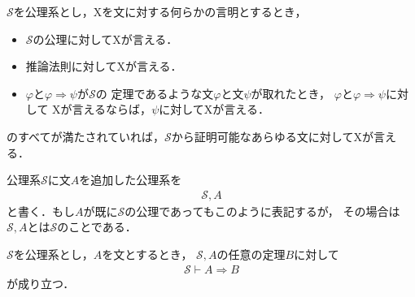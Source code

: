 	\begin{screen}
		\begin{metaaxm}[証明に対する構造的帰納法]
			$\mathscr{S}$を公理系とし，Xを文に対する何らかの言明とするとき，
			\begin{itemize}
				\item $\mathscr{S}$の公理に対してXが言える．
				\item 推論法則に対してXが言える．
				\item $\varphi$と$\varphi \Longrightarrow \psi$が$\mathscr{S}$の
					定理であるような文$\varphi$と文$\psi$が取れたとき，
					$\varphi$と$\varphi \Longrightarrow \psi$に対して
					Xが言えるならば，$\psi$に対してXが言える．
			\end{itemize}
			のすべてが満たされていれば，$\mathscr{S}$から証明可能なあらゆる文に対してXが言える．
		\end{metaaxm}
	\end{screen}
	
	公理系$\mathscr{S}$に文$A$を追加した公理系を
	\begin{align}
		\mathscr{S}, A
	\end{align}
	と書く．もし$A$が既に$\mathscr{S}$の公理であってもこのように表記するが，
	その場合は$\mathscr{S}, A$とは$\mathscr{S}$のことである．
	
	\begin{screen}
		\begin{metathm}[演繹法則]
			$\mathscr{S}$を公理系とし，$A$を文とするとき，
			$\mathscr{S}, A$の任意の定理$B$に対して
			\begin{align}
				\mathscr{S} \vdash A \Longrightarrow B
			\end{align}
			が成り立つ．
		\end{metathm}
	\end{screen}
	

